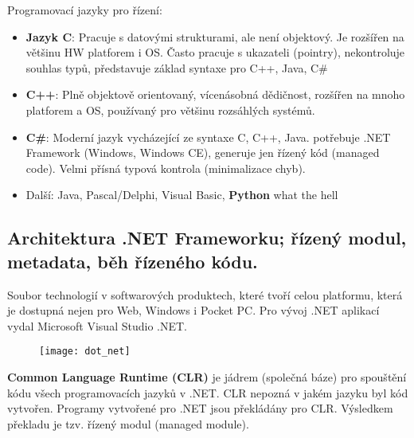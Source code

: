 Programovací jazyky pro řízení:
\begin{itemize}
\item \textbf{Jazyk C}: Pracuje s datovými strukturami, ale není objektový. Je rozšířen na většinu HW platforem i OS. Často pracuje s ukazateli (pointry), nekontroluje souhlas typů, představuje základ syntaxe pro C++, Java, C\#
\item \textbf{C++}: Plně objektově orientovaný, vícenásobná dědičnost, rozšířen na mnoho platforem a OS, používaný pro většinu rozsáhlých systémů.
\item \textbf{C\#}: Moderní jazyk vycházející ze syntaxe C, C++, Java. potřebuje .NET Framework (Windows, Windows CE), generuje jen řízený kód (managed code). Velmi přísná typová kontrola (minimalizace chyb).
\item Další: Java, Pascal/Delphi, Visual Basic, \textbf{Python} what the hell
\end{itemize}

\subsection{Architektura .NET Frameworku; řízený modul, metadata, běh řízeného kódu.}
Soubor technologií v softwarových produktech, které tvoří celou platformu, která je dostupná nejen pro Web, Windows i Pocket PC. Pro vývoj .NET aplikací vydal Microsoft Visual Studio .NET.
\begin{figure}[H]
  \centering
  \texttt{[image: dot\_net]}
\end{figure}
\textbf{Common Language Runtime (CLR)} je jádrem (společná báze) pro spouštění kódu všech programovacích jazyků v .NET. CLR nepozná v jakém jazyku byl kód vytvořen. Programy vytvořené pro .NET jsou překládány pro CLR. Výsledkem překladu je tzv. řízený modul (managed module).

